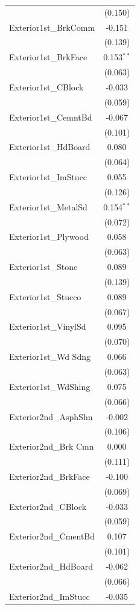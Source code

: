 \begin{table}[!htbp]
\begin{tabular}{@{\extracolsep{5pt}}lc}
& (0.150) \\
 Exterior1st\_BrkComm & -0.151$^{}$ \\
& (0.139) \\
 Exterior1st\_BrkFace & 0.153$^{**}$ \\
& (0.063) \\
 Exterior1st\_CBlock & -0.033$^{}$ \\
& (0.059) \\
 Exterior1st\_CemntBd & -0.067$^{}$ \\
& (0.101) \\
 Exterior1st\_HdBoard & 0.080$^{}$ \\
& (0.064) \\
 Exterior1st\_ImStucc & 0.055$^{}$ \\
& (0.126) \\
 Exterior1st\_MetalSd & 0.154$^{**}$ \\
& (0.072) \\
 Exterior1st\_Plywood & 0.058$^{}$ \\
& (0.063) \\
 Exterior1st\_Stone & 0.089$^{}$ \\
& (0.139) \\
 Exterior1st\_Stucco & 0.089$^{}$ \\
& (0.067) \\
 Exterior1st\_VinylSd & 0.095$^{}$ \\
& (0.070) \\
 Exterior1st\_Wd Sdng & 0.066$^{}$ \\
& (0.063) \\
 Exterior1st\_WdShing & 0.075$^{}$ \\
& (0.066) \\
 Exterior2nd\_AsphShn & -0.002$^{}$ \\
& (0.106) \\
 Exterior2nd\_Brk Cmn & 0.000$^{}$ \\
& (0.111) \\
 Exterior2nd\_BrkFace & -0.100$^{}$ \\
& (0.069) \\
 Exterior2nd\_CBlock & -0.033$^{}$ \\
& (0.059) \\
 Exterior2nd\_CmentBd & 0.107$^{}$ \\
& (0.101) \\
 Exterior2nd\_HdBoard & -0.062$^{}$ \\
& (0.066) \\
 Exterior2nd\_ImStucc & -0.035$^{}$ \\

\end{tabular}
\end{table}
